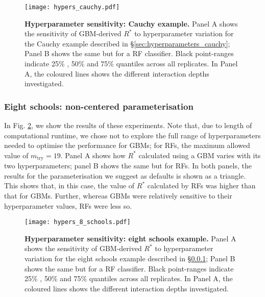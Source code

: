\documentclass{article}
\begin{document}
\begin{figure}[!htb]
	\centerline{\texttt{[image: hypers\_cauchy.pdf]}}
	\caption{\textbf{Hyperparameter sensitivity: Cauchy example.} Panel A shows the sensitivity of GBM-derived $R^*$ to hyperparameter variation for the Cauchy example described in \S\ref{sec:hyperparameters_cauchy}; Panel B shows the same but for a RF classifier. Black point-ranges indicate 25\% , 50\% and 75\% quantiles across all replicates. In Panel A, the coloured lines shows the different interaction depths investigated.}
	\label{fig:hypers_cauchy}
\end{figure}

\subsubsection{Eight schools: non-centered parameterisation}\label{sec:hyperparameters_8_schools}
In Fig. \ref{fig:hypers_8_schools}, we show the results of these experiments. Note that, due to length of computational runtime, we chose not to explore the full range of hyperparameters needed to optimise the performance for GBMs; for RFs, the maximum allowed value of $m_{\text{try}}=19$. Panel A shows how $R^*$ calculated using a GBM varies with its two hyperparameters; panel B shows the same but for RFs. In both panels, the results for the parameterisation we suggest as defaults is shown as a triangle. This shows that, in this case, the value of $R^*$ calculated by RFs was higher than that for GBMs. Further, whereas GBMs were relatively sensitive to their hyperparameter values, RFs were less so.

\begin{figure}[!htb]
	\centerline{\texttt{[image: hypers\_8\_schools.pdf]}}
	\caption{\textbf{Hyperparameter sensitivity: eight schools example.} Panel A shows the sensitivity of GBM-derived $R^*$ to hyperparameter variation for the eight schools example described in \S\ref{sec:hyperparameters_8_schools}; Panel B shows the same but for a RF classifier. Black point-ranges indicate 25\% , 50\% and 75\% quantiles across all replicates. In Panel A, the coloured lines shows the different interaction depths investigated.}
	\label{fig:hypers_8_schools}
\end{figure}

\color{black}


 
\end{document}
